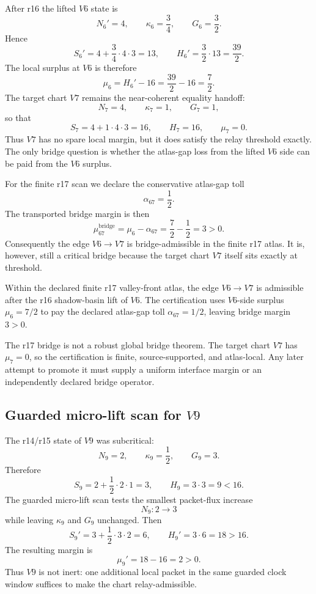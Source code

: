 After r16 the lifted \(V6\) state is
\[
N_6'=4,
\qquad
\kappa_6=\frac34,
\qquad
G_6=\frac32.
\]
Hence
\[
S_6'=4+\frac34\cdot4\cdot3=13,
\qquad
H_6'=\frac32\cdot13=\frac{39}{2}.
\]
The local surplus at \(V6\) is therefore
\[
\mu_6=H_6'-16=\frac{39}{2}-16=\frac72.
\]
The target chart \(V7\) remains the near-coherent equality handoff:
\[
N_7=4,
\qquad
\kappa_7=1,
\qquad
G_7=1,
\]
so that
\[
S_7=4+1\cdot4\cdot3=16,
\qquad
H_7=16,
\qquad
\mu_7=0.
\]
Thus \(V7\) has no spare local margin, but it does satisfy the relay threshold
exactly.  The only bridge question is whether the atlas-gap loss from the
lifted \(V6\) side can be paid from the \(V6\) surplus.

For the finite r17 scan we declare the conservative atlas-gap toll
\[
\alpha_{67}=\frac12.
\]
The transported bridge margin is then
\[
\mu_{67}^{\mathrm{bridge}}
=\mu_6-\alpha_{67}
=\frac72-\frac12
=3>0.
\]
Consequently the edge \(V6\to V7\) is bridge-admissible in the finite r17 atlas.
It is, however, still a critical bridge because the target chart \(V7\) itself
sits exactly at threshold.

\begin{proposition}
\label{prop:v470-r17-v6-v7-bridge}
Within the declared finite r17 valley-front atlas, the edge \(V6\to V7\) is
admissible after the r16 shadow-basin lift of \(V6\).  The certification uses
\(V6\)-side surplus \(\mu_6=7/2\) to pay the declared atlas-gap toll
\(\alpha_{67}=1/2\), leaving bridge margin \(3>0\).
\end{proposition}

\begin{remark}
\label{rem:v470-r17-critical-target-guard}
The r17 bridge is not a robust global bridge theorem.  The target chart \(V7\)
has \(\mu_7=0\), so the certification is finite, source-supported, and
atlas-local.  Any later attempt to promote it must supply a uniform interface
margin or an independently declared bridge operator.
\end{remark}

\subsection{Guarded micro-lift scan for \texorpdfstring{\(V9\)}{V9}}
\label{subsec:v470-r17-v9-microlift-scan}

The r14/r15 state of \(V9\) was subcritical:
\[
N_9=2,
\qquad
\kappa_9=\frac12,
\qquad
G_9=3.
\]
Therefore
\[
S_9=2+\frac12\cdot2\cdot1=3,
\qquad
H_9=3\cdot3=9<16.
\]
The guarded micro-lift scan tests the smallest packet-flux increase
\[
N_9:2\to3
\]
while leaving \(\kappa_9\) and \(G_9\) unchanged.  Then
\[
S_9'=3+\frac12\cdot3\cdot2=6,
\qquad
H_9'=3\cdot6=18>16.
\]
The resulting margin is
\[
\mu_9'=18-16=2>0.
\]
Thus \(V9\) is not inert: one additional local packet in the same guarded
clock window suffices to make the chart relay-admissible.

